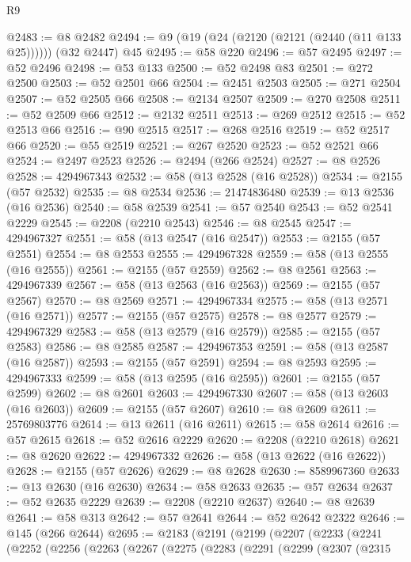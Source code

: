 \begin{lexlean}{R9}
\begin{coremodule}
@2483 := @8 @2482
@2494 := @9 (@19 (@24 (@2120 (@2121 (@2440 (@11 @133 @25)))))) (@32 @2447) @45
@2495 := @58 @220
@2496 := @57 @2495
@2497 := @52 @2496
@2498 := @53 @133
@2500 := @52 @2498 @83
@2501 := @272 @2500
@2503 := @52 @2501 @66
@2504 := @2451 @2503
@2505 := @271 @2504
@2507 := @52 @2505 @66
@2508 := @2134 @2507
@2509 := @270 @2508
@2511 := @52 @2509 @66
@2512 := @2132 @2511
@2513 := @269 @2512
@2515 := @52 @2513 @66
@2516 := @90 @2515
@2517 := @268 @2516
@2519 := @52 @2517 @66
@2520 := @55 @2519
@2521 := @267 @2520
@2523 := @52 @2521 @66
@2524 := @2497 @2523
@2526 := @2494 (@266 @2524)
@2527 := @8 @2526
@2528 := 4294967343
@2532 := @58 (@13 @2528 (@16 @2528))
@2534 := @2155 (@57 @2532)
@2535 := @8 @2534
@2536 := 21474836480
@2539 := @13 @2536 (@16 @2536)
@2540 := @58 @2539
@2541 := @57 @2540
@2543 := @52 @2541 @2229
@2545 := @2208 (@2210 @2543)
@2546 := @8 @2545
@2547 := 4294967327
@2551 := @58 (@13 @2547 (@16 @2547))
@2553 := @2155 (@57 @2551)
@2554 := @8 @2553
@2555 := 4294967328
@2559 := @58 (@13 @2555 (@16 @2555))
@2561 := @2155 (@57 @2559)
@2562 := @8 @2561
@2563 := 4294967339
@2567 := @58 (@13 @2563 (@16 @2563))
@2569 := @2155 (@57 @2567)
@2570 := @8 @2569
@2571 := 4294967334
@2575 := @58 (@13 @2571 (@16 @2571))
@2577 := @2155 (@57 @2575)
@2578 := @8 @2577
@2579 := 4294967329
@2583 := @58 (@13 @2579 (@16 @2579))
@2585 := @2155 (@57 @2583)
@2586 := @8 @2585
@2587 := 4294967353
@2591 := @58 (@13 @2587 (@16 @2587))
@2593 := @2155 (@57 @2591)
@2594 := @8 @2593
@2595 := 4294967333
@2599 := @58 (@13 @2595 (@16 @2595))
@2601 := @2155 (@57 @2599)
@2602 := @8 @2601
@2603 := 4294967330
@2607 := @58 (@13 @2603 (@16 @2603))
@2609 := @2155 (@57 @2607)
@2610 := @8 @2609
@2611 := 25769803776
@2614 := @13 @2611 (@16 @2611)
@2615 := @58 @2614
@2616 := @57 @2615
@2618 := @52 @2616 @2229
@2620 := @2208 (@2210 @2618)
@2621 := @8 @2620
@2622 := 4294967332
@2626 := @58 (@13 @2622 (@16 @2622))
@2628 := @2155 (@57 @2626)
@2629 := @8 @2628
@2630 := 8589967360
@2633 := @13 @2630 (@16 @2630)
@2634 := @58 @2633
@2635 := @57 @2634
@2637 := @52 @2635 @2229
@2639 := @2208 (@2210 @2637)
@2640 := @8 @2639
@2641 := @58 @313
@2642 := @57 @2641
@2644 := @52 @2642 @2322
@2646 := @145 (@266 @2644)
@2695 := @2183
    (@2191
      (@2199
        (@2207
          (@2233
            (@2241
              (@2252
                (@2256
                  (@2263
                    (@2267
                      (@2275
                        (@2283
                          (@2291
                            (@2299
                              (@2307
                                (@2315

\end{coremodule}
\end{lexlean}
